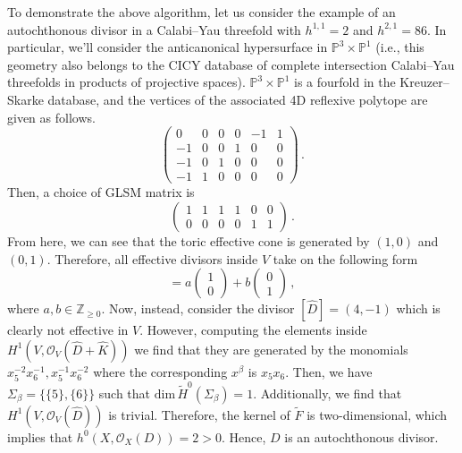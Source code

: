 \documentclass[11pt,dvipsnames]{article}
\theoremstyle{definition}
\begin{document}
To demonstrate the above algorithm, let us consider the example of an autochthonous divisor in a Calabi--Yau threefold with $h^{1,1}=2$ and $h^{2,1}=86$. In particular, we'll consider the anticanonical hypersurface in $\mathbb{P}^3 \times \mathbb{P}^1$ (i.e., this geometry also belongs to the CICY database of complete intersection Calabi--Yau threefolds in products of projective spaces). $\mathbb{P}^3 \times \mathbb{P}^1$ is a fourfold in the Kreuzer--Skarke database, and the vertices of the associated 4D reflexive polytope are given as follows.
\begin{equation}
    \begin{pmatrix}
        0&0&0&0&-1&1\\
        -1&0&0&1&0&0\\
        -1&0&1&0&0&0\\
        -1&1&0&0&0&0
    \end{pmatrix}\,.    
\end{equation}
Then, a choice of GLSM matrix is
\begin{equation}
    \begin{pmatrix}
        1&1&1&1&0&0\\
        0&0&0&0&1&1
    \end{pmatrix}\,.
\end{equation}
From here, we can see that the toric effective cone is generated by $(1,0)$ and $(0,1)$. Therefore, all effective divisors inside $V$ take on the following form
\begin{equation}
    [\hat{D}]=a\begin{pmatrix}
       1\\
       0
    \end{pmatrix}+b
    \begin{pmatrix}
        0\\
        1
    \end{pmatrix}\,,
\end{equation}
where $a,b\in\mathbb{Z}_{\geq 0}$.
Now, instead, consider the divisor $[\hat{D}]=(4,-1)$ which is clearly not effective in $V$. However, computing the elements inside $H^1(V,\mathcal{O}_V(\hat{D}+\hat{K}))$ we find that they are generated by the monomials $x_5^{-2}x_6^{-1}, x_5^{-1}x_6^{-2}$ where the corresponding $x^\beta$ is $x_5x_6$. Then, we have $\Sigma_{\beta}=\{\{5\},\{6\}\}$ such that $\mathrm{dim} \, \tilde{H}^0(\Sigma_{\beta})=1$. Additionally, we find that $H^1(V,\mathcal{O}_V(\hat{D}))$ is trivial. Therefore, the kernel of $\tilde{F}$ is two-dimensional, which implies that $h^0(X,\mathcal{O}_X(D)) = 2 > 0$. Hence, $D$ is an autochthonous divisor.
\end{document}
